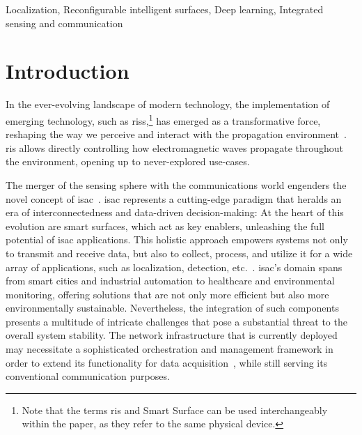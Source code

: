\documentclass[10pt,journal,compsoc]{IEEEtran}
\begin{document}
\begin{IEEEkeywords}
Localization, Reconfigurable intelligent surfaces, Deep learning, Integrated sensing and communication
\end{IEEEkeywords}



\glsresetall

\section{Introduction}
\label{sec:introduction}

In the ever-evolving landscape of modern technology, the implementation of emerging technology, such as \glspl{ris},\footnote{Note that the terms \gls{ris} and Smart Surface can be used interchangeably within the paper, as they refer to the same physical device.} has emerged as a transformative force, reshaping the way we perceive and interact with the propagation environment~\cite{DiRenzo2020_Jsac}. \gls{ris} allows directly controlling how electromagnetic waves propagate throughout the environment, opening up to never-explored use-cases. 

The merger of the sensing sphere with the communications world engenders the novel concept of \gls{isac}~\cite{ZRWGY_surveys_2022}. \gls{isac} represents a cutting-edge paradigm that heralds an era of interconnectedness and data-driven decision-making: At the heart of this evolution are smart surfaces, which act as key enablers, unleashing the full potential of \gls{isac} applications.
This holistic approach empowers systems not only to transmit and receive data, but also to collect, process, and utilize it for a wide array of applications, such as localization, detection, etc.~\cite{QLYA_Commag_2023}. \gls{isac}'s domain spans from smart cities and industrial automation to healthcare and environmental monitoring, offering solutions that are not only more efficient but also more environmentally sustainable. 
Nevertheless, the integration of such components presents a multitude of intricate challenges that pose a substantial threat to the overall system stability. The network infrastructure that is currently deployed may necessitate a sophisticated orchestration and management framework in order to extend its functionality for data acquisition~\cite{YHLPZ_TSP_2022}, while still serving its conventional communication purposes.
\end{document}

